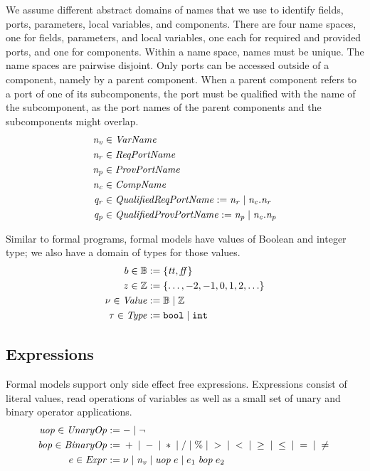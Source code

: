 \documentclass[a4paper,10pt,english]{article}
\begin{document}
We assume different abstract domains of names that we use to identify fields, ports, parameters, local variables, and components.
There are four name spaces, one for fields, parameters, and local variables, one each for required and provided ports, and one for
components. Within a name space, names must be unique. The name spaces are pairwise disjoint. Only ports can be accessed
outside of a component, namely by a parent component. When a parent component refers to a port of one of its
subcomponents, the port must be qualified with the name of the subcomponent, as the port names of the parent components and the
subcomponents might overlap.
\begin{align*}
	\mathit{n_v} &\in \mathit{VarName} \\
	\mathit{n_r} &\in \mathit{ReqPortName} \\
	\mathit{n_p} &\in \mathit{ProvPortName} \\
	\mathit{n_c} &\in \mathit{CompName} \\
	\mathit{q_r} &\in \mathit{QualifiedReqPortName} := \mathit{n_r} \mid \mathit{n_c}\mathtt{.}\mathit{n_r} \\
	\mathit{q_p} &\in \mathit{QualifiedProvPortName} := \mathit{n_p} \mid \mathit{n_c}\mathtt{.}\mathit{n_p}
\end{align*}

Similar to formal programs, formal models have values of Boolean and integer type; we also have a domain of types
for those values.
\begin{align*}
    b \in \mathbb{B} &:= \{ \mathit{tt}, \mathit{ff} \}
    \\
    z \in \mathbb{Z} &:= \{ \ldots, -2, -1, 0, 1, 2, \ldots \}
    \\
    \nu \in \mathit{Value} &:= \mathbb{B} \mid \mathbb{Z}
    \\
	\tau \in \mathit{Type} &:= \mathtt{bool} \mid \mathtt{int}
\end{align*}

\subsection{Expressions}

Formal models support only side effect free expressions. Expressions consist of literal values, read operations of variables
as well as a small set of unary and binary operator applications.
\begin{align*}
	\mathit{uop} \in \mathit{UnaryOp} & := - \mid \neg
	\\
    \mathit{bop} \in \mathit{BinaryOp} & := {} + {} \mid {} - {} \mid {} \ast {} \mid {} / {}
                       \mid {} \% {} \mid {} > {} \mid {} < {} \mid {} \geq {} 
                       \mid {} \leq {} \mid {} = {} \mid {} \neq {}
	\\
	e \in \mathit{Expr} & := 
		\nu \mid
		\mathit{n_v} \mid 
		\mathit{uop}\; e \mid
		e_1 \;\mathit{bop}\; e_2
\end{align*}
\end{document}
